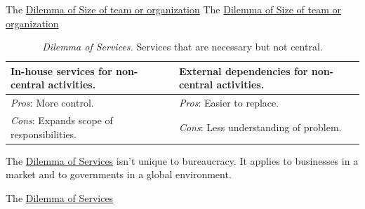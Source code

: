 The \href{table:staff-many-vs-few}{Dilemma of Size of team or organization}
The \href{table:staff-many-vs-few}{Dilemma of Size of team or organization}


\begin{center}
\begin{table}[H] %
\begin{tabular}{ | m{\dilemmatablewidth}| m{\dilemmatablewidth} | } 
  \hline
  \textbf{In-house services for non-central activities.} &
  \textbf{External dependencies for non-central activities.} \\
  \hline
  \textit{Pros}: More control. &
  \textit{Pros}: Easier to replace. \\
  \hline
  \textit{Cons}: Expands scope of responsibilities. & 
  \textit{Cons}: Less understanding of problem.  \\
  \hline
\end{tabular}
\caption{
\textit{Dilemma of Services.}
Services that are necessary but not central.
}
\label{table:inhouse-vs-external}
\end{table}
\end{center}

The \href{table:inhouse-vs-external}{Dilemma of Services} isn't unique to bureaucracy. It applies to businesses in a market and to governments in a global environment. 



The \href{table:inhouse-vs-external}{Dilemma of Services}


